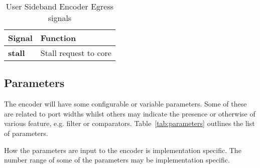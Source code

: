 \begin{table}[htp]
    \centering
    \caption{User Sideband Encoder Egress signals}
    \label{tab:engress-side-band}
    \begin{tabulary}{\textwidth}{|l|l|}
        \hline
        \textbf{Signal} & \textbf{Function} \\
        \hline
        \textbf{stall}& Stall request to core \\
        \hline
    \end{tabulary}
\end{table}

\subsection {Parameters}

The encoder will have some configurable or variable parameters. Some
of these are related to port widths whilst others may indicate the
presence or otherwise of various feature, e.g. filter or comparators.
Table~\ref{tab:parameters} outlines the list of parameters.

How the parameters are input to the encoder is implementation specific. The number range of some of the parameters  may be implementation specific. 

